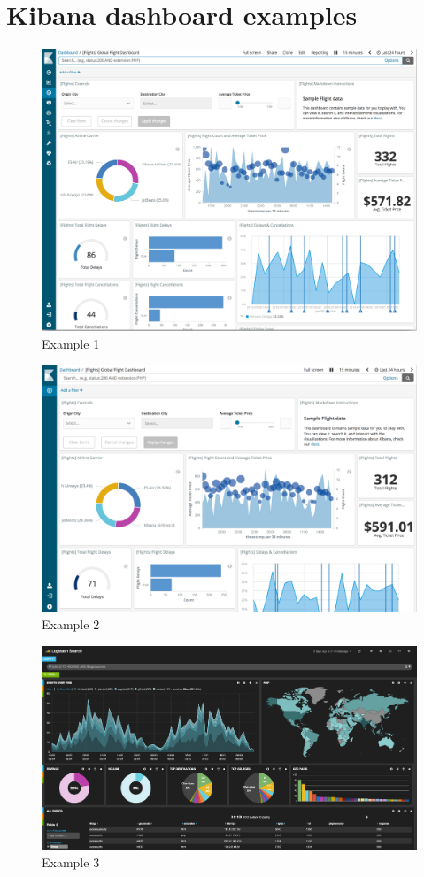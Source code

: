 \documentclass[]{report}
\begin{document}
\section{Kibana dashboard examples}
\begin{figure}[ht]
    \includegraphics[width =\columnwidth]{dashboard_example1.png}
    \caption{Example 1}
    \label{fig:EX1}
\end{figure}
\begin{figure}[ht]
    \includegraphics[width =\columnwidth]{dashboard_example2.png}
    \caption{Example 2}
    \label{fig:EX2}
\end{figure}
\begin{figure}[ht]
    \includegraphics[width =\columnwidth]{dashboard_example3.png}
    \caption{Example 3}
    \label{fig:EX3}
\end{figure}
\end{document}
